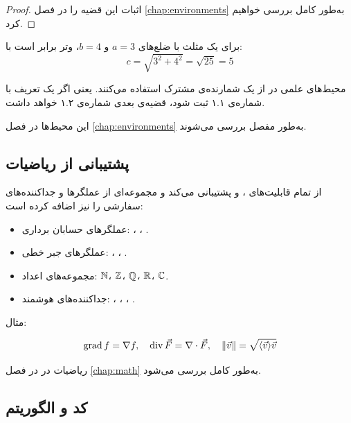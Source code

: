 \begin{proof}
    اثبات این قضیه را در فصل \cref{chap:environments}
    به‌طور کامل بررسی خواهیم کرد.
\end{proof}

\begin{example}
    برای یک مثلث با ضلع‌های $a = 3$ و $b = 4$،
    وتر برابر است با:
    \[
        c = \sqrt{3^{2} + 4^{2}} = \sqrt{25} = 5
    \]
    \label{ex:pythagoras-intro}
\end{example}

\begin{remark}
    محیط‌های علمی در  از یک شمارنده‌ی
    مشترک استفاده می‌کنند. یعنی اگر یک تعریف با
    شماره‌ی ۱.۱ ثبت شود، قضیه‌ی بعدی شماره‌ی ۱.۲
    خواهد داشت.
    \label{rem:shared-counter-intro}
\end{remark}

این محیط‌ها در فصل \cref{chap:environments} به‌طور
مفصل بررسی می‌شوند.

\subsection{پشتیبانی از ریاضیات}
\label{sec:introduction-math}

 از تمام قابلیت‌های ،
 و  پشتیبانی می‌کند
و مجموعه‌ای از عملگرها و جداکننده‌های سفارشی را
نیز اضافه کرده است:

\begin{itemize}
    \item عملگرهای حسابان برداری: ،
    ، .
    \item عملگرهای جبر خطی: ، ،
    .
    \item مجموعه‌های اعداد: $\mathbb{N}$، $\mathbb{Z}$، $\mathbb{Q}$، $\mathbb{R}$،
    $\mathbb{C}$.
    \item جداکننده‌های هوشمند: ، ،
    ، .
\end{itemize}

مثال:

\[
    \operatorname{grad} f = \nabla f, \quad
    \operatorname{div} \vec{F} = \nabla \cdot \vec{F}, \quad
    \lVert\vec{v}\rVert = \sqrt{\langle\vec{v}\rangle{\vec{v}}}
\]


ریاضیات در  در فصل \cref{chap:math}
به‌طور کامل بررسی می‌شود.

\subsection{کد و الگوریتم}
\label{sec:introduction-code}

